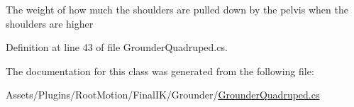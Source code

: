 The weight of how much the shoulders are pulled down by the pelvis when the shoulders are higher 



Definition at line 43 of file Grounder\+Quadruped.\+cs.



The documentation for this class was generated from the following file\+:\begin{DoxyCompactItemize}
\item 
Assets/\+Plugins/\+Root\+Motion/\+Final\+I\+K/\+Grounder/\mbox{\hyperlink{_grounder_quadruped_8cs}{Grounder\+Quadruped.\+cs}}\end{DoxyCompactItemize}
